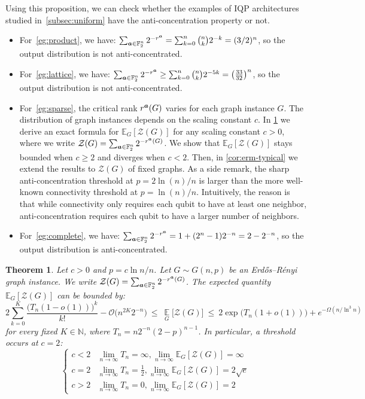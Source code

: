 \documentclass{article}
\theoremstyle{plain}
\newtheorem{theorem}{Theorem}[section]
\theoremstyle{definition}
\theoremstyle{remark}
\begin{document}
Using this proposition, we can check whether the examples of IQP architectures studied in~\cref{subsec:uniform} have the anti-concentration property or not. 
\begin{itemize}
    \item For~\cref{eg:product}, we have: $\sum_{{\bm{a}} \in \mathbb{F}_2^n}  2^{-r^{\bm{a}}}=\sum_{k=0}^n \binom{n}{k}2^{-k}=(3/2)^n$, so the output distribution is not anti-concentrated.
    \item For~\cref{eg:lattice}, we have: $\sum_{{\bm{a}} \in \mathbb{F}_2^n} 2^{-r^{\bm{a}}} \geq \sum_{k=0}^n \binom{n}{k}2^{-5k}=\left(\frac{33}{32}\right)^n$, so the output distribution is not anti-concentrated.
    \item For~\cref{eg:sparse}, the critical rank $r^{{\bm{a}}}(G)$ varies for each graph instance $G$. The distribution of graph instances depends on the scaling constant $c$. In \cref{thm:erm-sharp} we derive an exact formula for $\mathbb{E}_G[\mathcal Z(G)]$ for any scaling constant $c>0$, where we write $\mathcal Z(G)=\sum_{{\bm{a}}\in\mathbb F_2^n}2^{-r^{\bm{a}}(G)}$. We show that $\mathbb{E}_G[\mathcal Z(G)]$ stays bounded when $c\geq2$ and diverges when $c<2$. Then, in \cref{cor:erm-typical} we extend the results to $\mathcal Z(G)$ of fixed graphs. As a side remark, the sharp anti-concentration threshold at $p=2\ln(n)/n$ is larger than the more well-known connectivity threshold at $p=\ln(n)/n$. Intuitively, the reason is that while connectivity only requires each qubit to have at least one neighbor, anti-concentration requires each qubit to have a larger number of neighbors.
\item For~\cref{eg:complete}, we have: $\sum_{{\bm{a}} \in \mathbb{F}_2^n} 2^{-r^{\bm{a}}}= 1+(2^n-1)2^{-n} = 2 - 2^{-n}$, so the output distribution is anti-concentrated.
\end{itemize}

\begin{theorem}\label{thm:erm-sharp}
Let $c>0$ and $p=c\ln n/n$. Let $G\sim G(n,p)$ be an Erd\H{o}s--R\'enyi graph instance. We write $\mathcal Z(G)=\sum_{{\bm{a}}\in\mathbb F_2^n}2^{-r^{\bm{a}}(G)}$. The expected quantity $\mathbb{E}_G[\mathcal Z(G)]$ can be bounded by:
\begin{equation}\label{eq:erm-bounds}
2\sum_{k=0}^{K}\frac{\big(T_n(1-o(1))\big)^k}{k!}-\mathcal O\big(n^{2K}2^{-n}\big)\ \le\ \operatorname*{\mathbb{E}}_G\big[\mathcal Z(G)\big]\ \le\ 2\exp\big(T_n(1+o(1))\big)+e^{-\Omega(n/\ln^3n)}
\end{equation}
for every fixed $K\in\mathbb N$, where $T_n=n2^{-n}(2-p)^{n-1}$. In particular, a threshold occurs at $c=2$:
\begin{equation}
    \begin{cases}
    c<2 & \lim\limits_{n\to \infty} T_n = \infty, \lim\limits_{n\to \infty}\mathbb{E}_G[\mathcal Z(G)] = \infty \\
    c=2 & \lim\limits_{n\to \infty}T_n = \frac{1}{2}, \lim\limits_{n\to \infty}\mathbb{E}_G[\mathcal Z(G)] = 2\sqrt{e}\\
    c>2 & \lim\limits_{n\to \infty}T_n = 0, \lim\limits_{n\to \infty}\mathbb{E}_G[\mathcal Z(G)] = 2 
\end{cases}
\end{equation}
\end{theorem}
\end{document}

